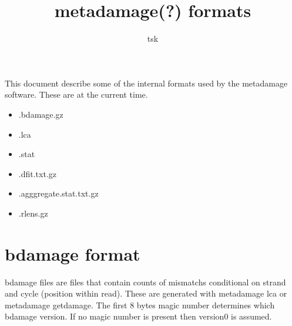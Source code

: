 \documentclass[10pt]{article}
\begin{document}
\title{metadamage(?) formats}
\author{tsk}
\maketitle
\vspace*{1em}

This document describe some of the internal formats used by the metadamage software. These are at the current time.
\begin{itemize}
\item .bdamage.gz
\item .lca
\item .stat
\item .dfit.txt.gz
\item .agggregate.stat.txt.gz
\item .rlens.gz
\end{itemize}

\section{bdamage format}
bdamage files are files that contain counts of mismatchs conditional on strand and cycle (position within read). These are generated with metadamage lca or metadamage getdamage. 
The first 8 bytes magic number determines which bdamage version. If no magic number is present then version0 is assumed. 
\end{document}
